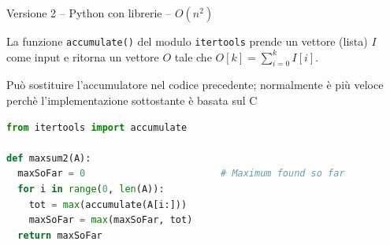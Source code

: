
\begin{frame}[fragile]{Versione 2 -- Python con librerie -- $O(n^2)$}

\vspace{-9pt}
\begin{myboxtitle}
La funzione \texttt{accumulate()} del modulo \texttt{itertools} prende un vettore (lista) $I$ come input e ritorna un vettore $O$ tale che $O[k] = \sum_{i=0}^k I[i]$. 

\medskip
Può sostituire l'accumulatore nel codice precedente; normalmente è più veloce perchè l'implementazione sottostante è basata sul C
\end{myboxtitle}

\vspace{-9pt}
\begin{lstlisting}[language=python]
from itertools import accumulate

def maxsum2(A):
  maxSoFar = 0                        # Maximum found so far
  for i in range(0, len(A)):
    tot = max(accumulate(A[i:]))
    maxSoFar = max(maxSoFar, tot)
  return maxSoFar
\end{lstlisting}


\end{frame}




